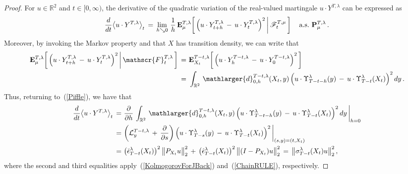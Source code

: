 \documentclass[10pt]{article}
\numberwithin{equation}{section}
\theoremstyle{definition}
\newcommand{\R}{{\mathbb R}}
\newcommand{\Rphi}{{\Upsilon}}
\begin{document}
\begin{appendix}
\begin{proof}
For  $u\in \R^2$ and $t\in [0,\infty)$, the derivative of the quadratic variation of the real-valued martingale $ u\cdot Y^{T,\lambda} $  can be expressed as
\begin{align}\label{Piffle}
    \frac{d}{dt}\big\langle u\cdot Y^{T,\lambda}\big\rangle_t\,=\,\lim_{h\searrow 0}\, \frac{1}{h} \, \mathbf{E}_{\mu}^{T,\lambda}\bigg[\, \Big(u\cdot Y^{T,\lambda}_{t+h}\, -\,u\cdot Y^{T,\lambda}_{t}\Big)^2\,\bigg|\,\mathscr{F}_t^{T,\mu} \,\bigg] \hspace{.3cm} \text{ a.s.\  } \mathbf{P}_{\mu}^{T,\lambda} \,.
\end{align}
Moreover, by invoking the Markov property and that $X$ has transition density, we can write that
\begin{align*}
\mathbf{E}_{\mu}^{T,\lambda}\bigg[\, \Big(u\cdot Y^{T,\lambda}_{t+h}\, -\,u\cdot Y^{T,\lambda}_{t}\Big)^2\,\bigg|\,\mathscr{F}_t^{T,\lambda} \,\bigg]\,=\,&\,\mathbf{E}_{X_t}^{T-t,\lambda}\bigg[\, \Big(u\cdot Y^{T-t,\lambda}_{h}\, -\, u\cdot  Y^{T-t,\lambda}_{0}\Big)^2 \,\bigg] \nonumber  \\
\,=\,&\,\int_{\R^2}\, \mathlarger{d}_{0,h}^{T-t,\lambda}(X_t,y) \,  \Big(u\cdot \Rphi_{T-t-h}^{\lambda}(y) \, -\, u\cdot \Rphi_{T-t}^{\lambda}(X_t)\Big)^2\, dy\,.
\end{align*}
Thus, returning to~(\ref{Piffle}), we have that
\begin{align*}
    \frac{d}{dt}\big\langle u\cdot Y^{T,\lambda}\big\rangle_t\,=\,&\,
   \frac{\partial}{\partial h}\,\int_{\R^2}\, \mathlarger{d}_{0,h}^{T-t,\lambda}(X_t,y)\,   \Big(u\cdot \Rphi_{T-t-h}^{\lambda}(y) \, -\, u\cdot \Rphi_{T-t}^{\lambda}(X_t)\Big)^2\, dy \,\bigg|_{h=0}  \nonumber \\
    \,=\,&\,\bigg( \mathcal{L}^{T-t,\lambda}_y\,+\,\frac{\partial}{\partial s}  \bigg) \,\Big(  u\cdot \Rphi_{T-s}^{\lambda}(y) \, -\, u\cdot \Rphi_{T-t}^{\lambda}(X_t) \Big)^2\,\bigg|_{(s,y)=(t,X_t)  }\nonumber 
     \\
    \,=\,&\,   \big(\check{\epsilon}^{\lambda}_{T-t}(X_t) \big)^2\, \big\| P_{X_t} u\big\|^2_2    \,+\,  \big(\hat{\epsilon}^{\lambda}_{T-t}(X_t) \big)^2 \,\big\|(I-P_{X_t}) u\big\|_2^2 \,=\,\big\|\sigma_{T-t}^{\lambda}(X_t)u\big\|_2^2\,, 
\end{align*}
where the second and third equalities apply~(\ref{KolmogorovForJBack}) and~(\ref{ChainRULE}), respectively.
\end{proof}



\end{appendix}
\end{document}
